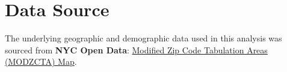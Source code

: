 \documentclass[12pt]{article}
\begin{document}
	\section*{Data Source}
	The underlying geographic and demographic data used in this analysis was sourced from \textbf{NYC Open Data}: 
	\href{https://data.cityofnewyork.us/Health/Modified-Zip-Code-Tabulation-Areas-MODZCTA-Map/5fzm-kpwv}{Modified Zip Code Tabulation Areas (MODZCTA) Map}.
	
\end{document}
